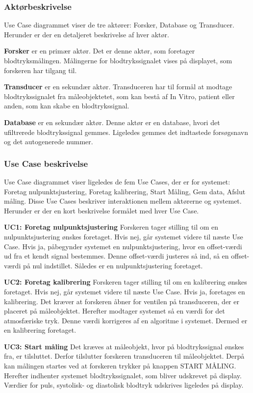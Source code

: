 \subsubsection{Aktørbeskrivelse}
Use Case diagrammet viser de tre aktører: Forsker, Database og Transducer. Herunder er der en detaljeret beskrivelse af hver aktør.

\textbf{Forsker} er en primær aktør. Det er denne aktør, som foretager blodtryksmålingen. Målingerne for blodtrykssignalet vises på displayet, som forskeren har tilgang til. 

\textbf{Transducer} er en sekundær aktør. Transduceren har til formål at modtage blodtrykssignalet fra måleobjektetet, som kan bestå af In Vitro, patient eller anden, som kan skabe en blodtrykssignal. 

\textbf{Database} er en sekundær aktør. Denne aktør er en database, hvori det ufiltrerede blodtrykssignal gemmes. Ligeledes gemmes det indtastede forsøgsnavn og det autogenerede nummer.

\subsubsection{Use Case beskrivelse}
Use Case diagrammet viser ligeledes de fem Use Cases, der er for systemet: Foretag nulpunktsjustering, Foretag kalibrering, Start Måling, Gem data, Afslut måling. Disse Use Cases beskriver interaktionen mellem aktørerne og systemet. Herunder er der en kort beskrivelse formålet med hver Use Case.

\textbf{UC1: Foretag nulpunktsjustering}
Forskeren tager stilling til om en nulpunktsjustering ønskes foretaget. Hvis nej, går systemet videre til næste Use Case. Hvis ja, påbegynder systemet en nulpunktsjustering, hvor en offset-værdi ud fra et kendt signal bestemmes. Denne offset-værdi justeres så ind, så en offset-værdi på nul indstillet. Således er en nulpunktsjustering foretaget.

\textbf{UC2: Foretag kalibrering}
Forskeren tager stilling til om en kalibrering ønskes foretaget. Hvis nej, går systemet videre til næste Use Case. Hvis ja, foretages en kalibrering. Det kræver at forskeren åbner for ventilen på transduceren, der er placeret på måleobjektet. Herefter modtager systemet så en værdi for det atmosfæriske tryk. Denne værdi korrigeres af en algoritme i systemet. Dermed er en kalibrering foretaget.  

\textbf{UC3: Start måling}
Det kræves at måleobjekt, hvor på blodtrykssignal ønskes fra, er tilsluttet. Derfor tilslutter forskeren transduceren til måleobjektet. Derpå kan målingen startes ved at forskeren trykker på knappen START MÅLING. Herefter indhenter systemet blodtrykssignalet, som bliver udskrevet på display. Værdier for puls, systolisk- og diastolisk blodtryk udskrives ligeledes på display. 

